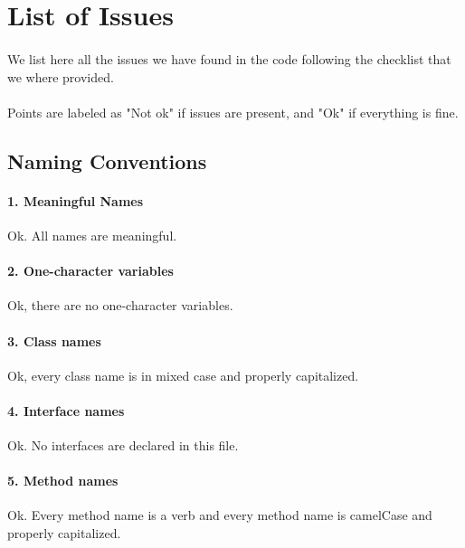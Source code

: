 \documentclass[english]{article}
\begin{document}
\newpage
\section{List of Issues} %
\paragraph{}
We list here all the issues we have found in the code following the checklist that we where provided.

\paragraph{}
Points are labeled as "Not ok" if issues are present, and "Ok" if everything is fine.


\subsection{Naming Conventions}

\paragraph{1. Meaningful Names}
Ok. All names are meaningful.

\paragraph{2. One-character variables}
Ok, there are no one-character variables.

\paragraph{3. Class names}
Ok, every class name is in mixed case and properly capitalized.

\paragraph{4. Interface names}
Ok. No interfaces are declared in this file.

\paragraph{5. Method names}
Ok. Every method name is a verb and every method name is camelCase and properly capitalized.
\end{document}
